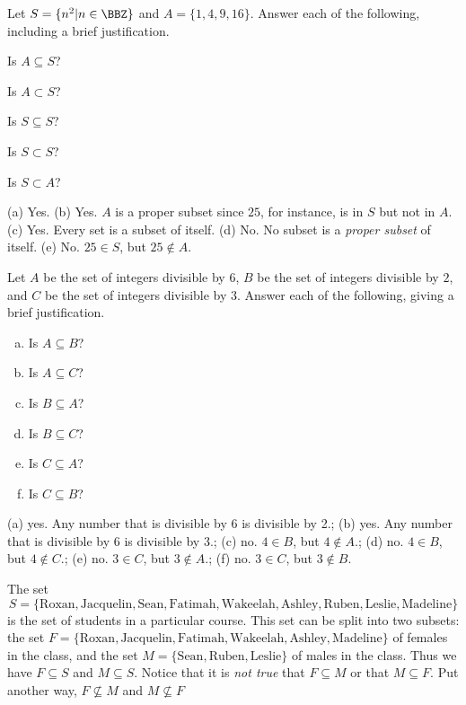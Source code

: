 \begin{exer}
Let  $S = \{n^2|n\in \BBZ\}$ and  $A = \{ 1, 4, 9, 16\}$.
Answer each of the following, including a brief justification.
\begin{lenum}
\item
Is $A\subseteq S$?\blanklinefill
\item
Is $A\subset S$? \blanklinefill
\item
Is $S\subseteq S$? \blanklinefill
\item
Is $S\subset S$? \blanklinefill
\item
Is $S\subset A$? \blanklinefill
\end{lenum}
\begin{answer}
(a) Yes.
(b) Yes.  $A$ is a proper subset since $25$, for instance, is in $S$ but not in $A$.
(c) Yes.  Every set is a subset of itself.
(d) No.  No subset is a {\em proper subset} of itself.
(e) No.  $25\in S$, but $25\not\in A$.
\end{answer}
\end{exer}

\newpage %

\begin{exer}
Let $A$ be the set of integers divisible by $6$, $B$ be the set of integers divisible by $2$, and
$C$ be the set of integers divisible by $3$.
Answer each of the following, giving a brief justification.
\begin{enumerate}[(a)]
\item Is $A\subseteq B$?\blanklinefill
\item Is $A\subseteq C$?\blanklinefill
\item Is $B\subseteq A$?\blanklinefill
\item Is $B\subseteq C$?\blanklinefill
\item Is $C\subseteq A$?\blanklinefill
\item Is $C\subseteq B$?\blanklinefill
\end{enumerate}
\begin{answer}
(a) yes.  Any number that is divisible by 6 is divisible by 2.;
(b) yes. Any number that is divisible by 6 is divisible by 3.; 
(c) no.  $4\in B$, but $4\not\in A$.; 
(d) no.  $4\in B$, but $4\not\in C$.; 
(e) no.  $3\in C$, but $3\not\in A$.; 
(f) no.  $3\in C$, but $3\not\in B$.
\end{answer}
\end{exer}


\begin{exa}
The set $$S=\{\mathrm{Roxan, Jacquelin, Sean, Fatimah, Wakeelah, Ashley, Ruben,
Leslie, Madeline}\}$$
is the set of students in a particular course. 
This set can be split into two subsets: the
set $ F=\{\mathrm{Roxan, Jacquelin,
Fatimah, Wakeelah, Ashley, Madeline}\}$
of females in the class, and the set
$M=\{\mathrm{ Sean, Ruben, Leslie}\}$ of males in the class.  Thus we have $F\subseteq S$ and
$M \subseteq S$. Notice that it is {\em not true} that $F\subseteq
M$ or that $M \subseteq F$. Put another way, $F\not\subseteq M$ and $M \not\subseteq F$
\end{exa}




